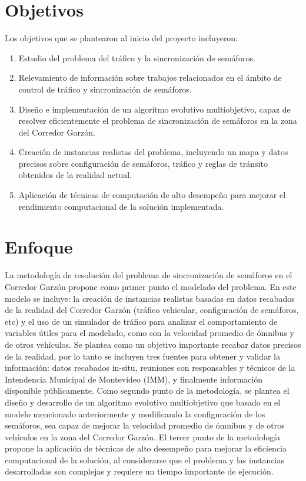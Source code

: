\section{Objetivos}

Los objetivos que se plantearon al inicio del proyecto incluyeron:
\begin{enumerate}
  \setlength{\itemsep}{0pt}
	\item Estudio del problema del tráfico y la sincronización de semáforos.
	\item Relevamiento de información sobre trabajos relacionados en el ámbito de control de tráfico y sincronización de semáforos.
	\item Diseño e implementación de un algoritmo evolutivo multiobjetivo, capaz de resolver eficientemente el problema de sincronización de semáforos en la zona del Corredor Garzón.
	\item Creación de instancias realistas del problema, incluyendo un mapa y datos precisos sobre configuración de semáforos, tráfico y reglas de tránsito obtenidos de la realidad actual.	
	\item Aplicación de técnicas de computación de alto desempeño para mejorar el rendimiento computacional de la solución implementada.

\end{enumerate}
 
\section{Enfoque}
La metodología de resolución del problema de sincronización de semáforos en el Corredor Garzón propone como primer punto el modelado del problema. En este modelo se incluye: la creación de instancias realistas basadas en datos recabados de la realidad del Corredor Garzón (tráfico vehicular, configuración de semáforos, etc) y el uso de un simulador de tráfico para analizar el comportamiento de variables útiles para el modelado, como son la velocidad promedio de ómnibus y de otros vehículos. Se plantea como un objetivo importante recabar datos precisos de la realidad, por lo tanto se incluyen tres fuentes para obtener y validar la información: datos recabados in-situ, reuniones con responsables y técnicos de la Intendencia Municipal de Montevideo (IMM), y finalmente información disponible públicamente.
Como segundo punto de la metodología, se plantea el diseño y desarrollo de un algoritmo evolutivo multiobjetivo que basado en el modelo mencionado anteriormente y modificando la configuración de los semáforos, sea capaz de mejorar la velocidad promedio de ómnibus y de otros vehículos en la zona del Corredor Garzón. 
El tercer punto de la metodología propone la aplicación de técnicas de alto desempeño para mejorar la eficiencia computacional de la solución, al considerarse que el problema y las instancias desarrolladas son complejas y requiere un tiempo importante de ejecución.




